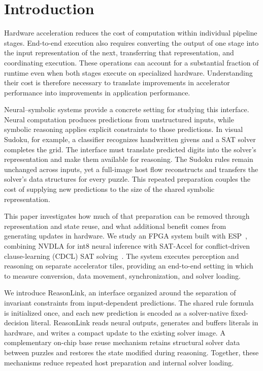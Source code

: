 \section{Introduction}
Hardware acceleration reduces the cost of computation within individual pipeline stages. End-to-end execution also requires converting the output of one stage into the input representation of the next, transferring that representation, and coordinating execution. These operations can account for a substantial fraction of runtime even when both stages execute on specialized hardware. Understanding their cost is therefore necessary to translate improvements in accelerator performance into improvements in application performance.

Neural--symbolic systems provide a concrete setting for studying this interface. Neural computation produces predictions from unstructured inputs, while symbolic reasoning applies explicit constraints to those predictions. In visual Sudoku, for example, a classifier recognizes handwritten givens and a SAT solver completes the grid. The interface must translate predicted digits into the solver's representation and make them available for reasoning. The Sudoku rules remain unchanged across inputs, yet a full-image host flow reconstructs and transfers the solver's data structures for every puzzle. This repeated preparation couples the cost of supplying new predictions to the size of the shared symbolic representation.

This paper investigates how much of that preparation can be removed through representation and state reuse, and what additional benefit comes from generating updates in hardware. We study an FPGA system built with ESP~\cite{esp}, combining NVDLA for int8 neural inference with SAT-Accel for conflict-driven clause-learning (CDCL) SAT solving~\cite{sataccel}. The system executes perception and reasoning on separate accelerator tiles, providing an end-to-end setting in which to measure conversion, data movement, synchronization, and solver loading.

We introduce ReasonLink, an interface organized around the separation of invariant constraints from input-dependent predictions. The shared rule formula is initialized once, and each new prediction is encoded as a solver-native fixed-decision literal. ReasonLink reads neural outputs, generates and buffers literals in hardware, and writes a compact update to the existing solver image. A complementary on-chip base reuse mechanism retains structural solver data between puzzles and restores the state modified during reasoning. Together, these mechanisms reduce repeated host preparation and internal solver loading.

